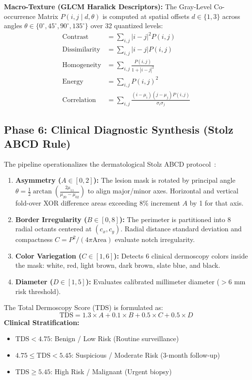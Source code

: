 \documentclass[conference]{IEEEtran}
\begin{document}
\textbf{Macro-Texture (GLCM Haralick Descriptors):} The Gray-Level Co-occurrence Matrix $P(i, j \mid d, \theta)$ is computed at spatial offsets $d \in \{1, 3\}$ across angles $\theta \in \{0^\circ, 45^\circ, 90^\circ, 135^\circ\}$ over 32 quantized levels:
\begin{align}
    \text{Contrast} &= \sum_{i, j} |i - j|^2 P(i, j) \\
    \text{Dissimilarity} &= \sum_{i, j} |i - j| P(i, j) \\
    \text{Homogeneity} &= \sum_{i, j} \frac{P(i, j)}{1 + |i - j|^2} \\
    \text{Energy} &= \sum_{i, j} P(i, j)^2 \\
    \text{Correlation} &= \sum_{i, j} \frac{(i - \mu_i)(j - \mu_j) P(i, j)}{\sigma_i \sigma_j}
\end{align}

\subsection{Phase 6: Clinical Diagnostic Synthesis (Stolz ABCD Rule)}
The pipeline operationalizes the dermatological Stolz ABCD protocol~\cite{stolz1994abcd}:
\begin{enumerate}
    \item \textbf{Asymmetry ($A \in [0, 2]$):} The lesion mask is rotated by principal angle $\theta = \frac{1}{2} \arctan\left(\frac{2\mu_{11}}{\mu_{20} - \mu_{02}}\right)$ to align major/minor axes. Horizontal and vertical fold-over XOR difference areas exceeding 8\% increment $A$ by 1 for that axis.
    \item \textbf{Border Irregularity ($B \in [0, 8]$):} The perimeter is partitioned into 8 radial octants centered at $(c_x, c_y)$. Radial distance standard deviation and compactness $C = P^2 / (4\pi \text{Area})$ evaluate notch irregularity.
    \item \textbf{Color Variegation ($C \in [1, 6]$):} Detects 6 clinical dermoscopy colors inside the mask: white, red, light brown, dark brown, slate blue, and black.
    \item \textbf{Diameter ($D \in [1, 5]$):} Evaluates calibrated millimeter diameter ($>6\text{ mm}$ risk threshold).
\end{enumerate}
The Total Dermoscopy Score (TDS) is formulated as:
\begin{equation}
    \text{TDS} = 1.3 \times A + 0.1 \times B + 0.5 \times C + 0.5 \times D
\end{equation}
\textbf{Clinical Stratification:}
\begin{itemize}
    \item $\text{TDS} < 4.75$: Benign / Low Risk (Routine surveillance)
    \item $4.75 \le \text{TDS} < 5.45$: Suspicious / Moderate Risk (3-month follow-up)
    \item $\text{TDS} \ge 5.45$: High Risk / Malignant (Urgent biopsy)
\end{itemize}
\end{document}
